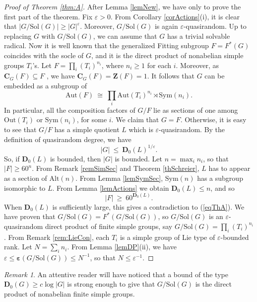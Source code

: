 \documentclass{daj}
\theoremstyle{definition}
\theoremstyle{remark}
\newtheorem{remark}[theorem]{Remark}
\newcommand{\Alt}{\mathrm{Alt}}
\newcommand{\Sym}{\mathrm{Sym}}
\newcommand{\Sol}{\mathrm{Sol}}
\newcommand{\Aut}{\mathrm{Aut}}
\newcommand{\Out}{\mathrm{Out}}
\newcommand{\C}{\mathbf{C}}
\newcommand{\D}{\mathbf{D}}
\newcommand{\Z}{\mathbf{Z}}
\renewcommand{\a}{\boldsymbol{\varepsilon}}
\begin{document}
\begin{proof}[Proof of Theorem \ref{thm:A}]
After Lemma \ref{lemNew}, we have only to prove the first part of the theorem.
Fix $\varepsilon>0$.
From Corollary \ref{corActions}(i), it is clear that $|G/\Sol(G)| \geq |G|^\varepsilon$.
Moreover, $G/\Sol(G)$ is again $\varepsilon$-quasirandom.
Up to replacing $G$ with $G/\Sol(G)$, we can assume that $G$ has a trivial solvable radical.
Now it is well known that the generalized Fitting subgroup $F=F^*(G)$ coincides with the socle of $G$,
and it is the direct product of nonabelian simple groups $T_i$'s.
Let $F= \prod_i (T_i)^{n_i}$, where $n_i \geq 1$ for each $i$.
Moreover, as $\C_G(F) \subseteq F$ \cite[(31.13)]{Asc00}, we have $\C_G(F) = \Z(F) =1$.
It follows that $G$ can be embedded as a subgroup of
$$ \Aut(F) \> \cong \> \prod_i \Aut(T_i)^{n_i} \rtimes \Sym(n_i) . $$
In particular, all the composition factors of $G/F$ lie as sections of one among $\Out(T_i)$ or $\Sym(n_i)$, for some $i$.
We claim that $G=F$.
Otherwise, it is easy to see that $G/F$ has a simple quotient $L$ which is $\varepsilon$-quasirandom.
 By the definition of quasirandom degree, we have
\begin{equation} \label{eqThA}
|G| \> \leq \> \D_0(L)^{1/\varepsilon} .
\end{equation}
So, if $\D_0(L)$ is bounded, then $|G|$ is bounded.
Let $n = \max_i n_i$, so that $|F| \geq 60^n$.
From Remark \ref{remSimSec} and Theorem \ref{thSchreier}, $L$ has to appear as a section of $\Alt(n)$.
From Lemma \ref{lemSymSec}, $\Sym(n)$ has a subgroup isomorphic to $L$.
From Lemma \ref{lemActions} we obtain $\D_0(L) \leq n$, and so
$$ |F| \> \geq \> 60^{\D_0(L)} . $$
When $\D_0(L)$ is sufficiently large, this gives a contradiction to (\ref{eqThA}).
We have proven that $G/\Sol(G)=F^*(G/\Sol(G))$, so $G/\Sol(G)$ is an $\varepsilon$-quasirandom direct product of finite simple groups,
say $G/\Sol(G) = \prod_i (T_i)^{n_i}$.
From Remark \ref{rem:LieCon}, each $T_i$ is a simple group of Lie type of $\varepsilon$-bounded rank.
Let $N= \sum_i n_i$.
From Lemma \ref{lemDP}(ii), we have $\varepsilon \leq \a(G/\Sol(G)) \leq N^{-1}$,
so that $N \leq \varepsilon^{-1}$.
\end{proof} 

\begin{remark} \label{remAtt} 
An attentive reader will have noticed that a bound of the type $\D_0(G) \geq c \log|G|$ is strong enough to give that
$G/\Sol(G)$ is the direct product of nonabelian finite simple groups.
\end{remark}
\end{document}
